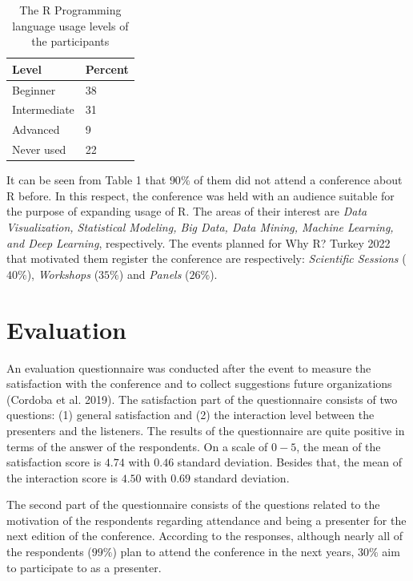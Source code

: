 \begin{table}

\caption{\label{tab:unnamed-chunk-3}The R Programming language usage levels of the participants}
\centering
\begin{tabular}[t]{l|l}
\hline
Level & Percent\\
\hline
Beginner & 38\\
\hline
Intermediate & 31\\
\hline
Advanced & 9\\
\hline
Never used & 22\\
\hline
\end{tabular}
\end{table}

It can be seen from Table 1 that \(90\%\) of them did not attend a conference about R before. In this respect, the conference was held with an audience suitable for the purpose of expanding usage of R. The areas of their interest are \emph{Data Visualization, Statistical Modeling, Big Data, Data Mining, Machine Learning, and Deep Learning}, respectively. The events planned for Why R? Turkey 2022 that motivated them register the conference are respectively: \emph{Scientific Sessions} (\(40\%\)), \emph{Workshops} (\(35\%\)) and \emph{Panels} (\(26\%\)).

\hypertarget{evaluation}{%
\section{Evaluation}\label{evaluation}}

An evaluation questionnaire was conducted after the event to measure the satisfaction with the conference and to collect suggestions future organizations (Cordoba et al. 2019). The satisfaction part of the questionnaire consists of two questions: (1) general satisfaction and (2) the interaction level between the presenters and the listeners. The results of the questionnaire are quite positive in terms of the answer of the respondents. On a scale of \(0-5\), the mean of the satisfaction score is \(4.74\) with \(0.46\) standard deviation. Besides that, the mean of the interaction score is \(4.50\) with \(0.69\) standard deviation.

The second part of the questionnaire consists of the questions related to the motivation of the respondents regarding attendance and being a presenter for the next edition of the conference. According to the responses, although nearly all of the respondents (\(99\%\)) plan to attend the conference in the next years, \(30\%\) aim to participate to as a presenter.


